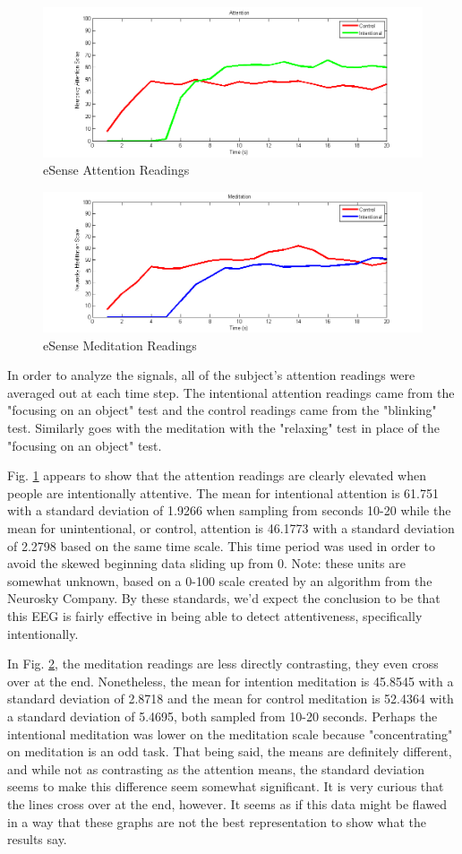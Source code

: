 \documentclass[journal]{IEEEtran}
\begin{document}
\begin{figure}[H]
    \centering
    \includegraphics[width=.5\textwidth]{EEG/Attention}
    \caption{eSense Attention Readings}
    \label{attention}
\end{figure}

\begin{figure}[H]
    \centering
    \includegraphics[width=.5\textwidth]{EEG/Meditation}
    \caption{eSense Meditation Readings}
    \label{meditation}
\end{figure} 

In order to analyze the signals, all of the subject's attention readings were averaged out at each time step. The intentional attention readings came from the "focusing on an object" test and the control readings came from the "blinking" test. Similarly goes with the meditation with the "relaxing" test in place of the "focusing on an object" test. \par 

Fig. \ref{attention} appears to show that the attention readings are clearly elevated when people are intentionally attentive. The mean for intentional attention is 61.751 with a standard deviation of 1.9266 when sampling from seconds 10-20 while the mean for unintentional, or control, attention is 46.1773 with a standard deviation of 2.2798 based on the same time scale. This time period was used in order to avoid the skewed beginning data sliding up from 0. Note: these units are somewhat unknown, based on a 0-100 scale created by an algorithm from the Neurosky Company. By these standards, we'd expect the conclusion to be that this EEG is fairly effective in being able to detect attentiveness, specifically intentionally. \par

In Fig. \ref{meditation}, the meditation readings are less directly contrasting, they even cross over at the end. Nonetheless, the mean for intention meditation is 45.8545 with a standard deviation of 2.8718 and the mean for control meditation is 52.4364 with a standard deviation of 5.4695, both sampled from 10-20 seconds. Perhaps the intentional meditation was lower on the meditation scale because "concentrating" on meditation is an odd task. That being said, the means are definitely different, and while not as contrasting as the attention means, the standard deviation seems to make this difference seem somewhat significant. It is very curious that the lines cross over at the end, however. It seems as if this data might be flawed in a way that these graphs are not the best representation to show what the results say.  \par
\end{document}
